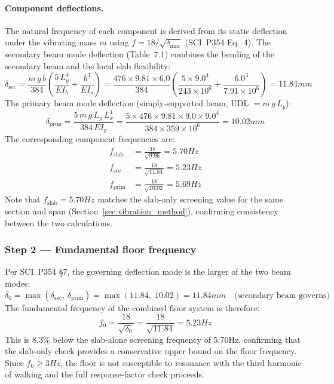 \paragraph{Component deflections.}
The natural frequency of each component is derived from its static deflection under the vibrating mass $m$ using $f = 18/\sqrt{\delta_\mathrm{mm}}$ (SCI~P354 Eq.~4). The secondary beam mode deflection (Table~7.1) combines the bending of the secondary beam and the local slab flexibility:
\begin{equation}
    \delta_\mathrm{sec} = \frac{m\,g\,b}{384}
        \left(\frac{5\,L_y^4}{EI_b} + \frac{b^3}{EI_s}\right)
    = \frac{476 \times 9.81 \times 6.0}{384}
        \left(\frac{5 \times 9.0^4}{243 \times 10^6} + \frac{6.0^3}{7.91 \times 10^6}\right)
    = 11.84 mm
\end{equation}
The primary beam mode deflection (simply-supported beam, UDL $= m\,g\,L_y$):
\begin{equation}
    \delta_\mathrm{prim} = \frac{5\,m\,g\,L_y\,L_x^4}{384\,EI_p}
    = \frac{5 \times 476 \times 9.81 \times 9.0 \times 9.0^4}{384 \times 359 \times 10^6}
    = 10.02mm
\end{equation}
The corresponding component frequencies are:
\begin{align}
    f_\mathrm{slab} &= \frac{18}{\sqrt{9.96}} = 5.70Hz \\
    f_\mathrm{sec}  &= \frac{18}{\sqrt{11.84}} =5.23Hz \\
    f_\mathrm{prim} &= \frac{18}{\sqrt{10.02}} =5.69Hz
\end{align}
Note that $f_\mathrm{slab} = 5.70Hz$ matches the slab-only screening value for the same section and span (Section~\ref{sec:vibration_method}), confirming consistency between the two calculations.

\subsubsection*{Step 2 --- Fundamental floor frequency}

Per SCI~P354 \S7, the governing deflection mode is the larger of the two beam modes:
\begin{equation}
    \delta_0 = \max(\delta_\mathrm{sec},\,\delta_\mathrm{prim}) = \max(11.84,\;10.02) = 11.84mm
    \quad \text{(secondary beam governs)}
\end{equation}
The fundamental frequency of the combined floor system is therefore:
\begin{equation}
    f_0 = \frac{18}{\sqrt{\delta_0}} = \frac{18}{\sqrt{11.84}} = 5.23Hz
\end{equation}
This is 8.3\% below the slab-alone screening frequency of 5.70Hz, confirming that the slab-only check provides a conservative upper bound on the floor frequency. Since $f_0 \geq 3Hz$, the floor is not susceptible to resonance with the third harmonic of walking and the full response-factor check proceeds.

